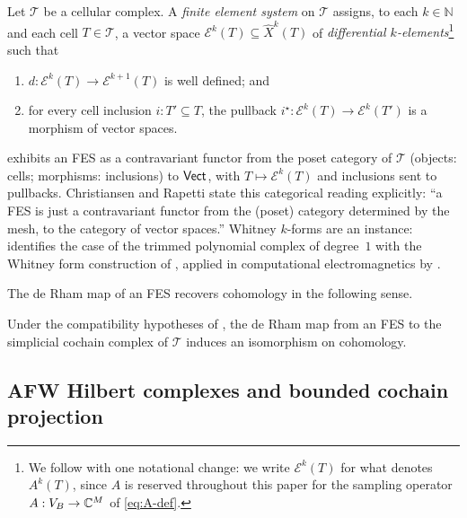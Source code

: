 \begin{definition}
\label{def:christiansen-fes}
Let $\mathcal{T}$ be a cellular complex. A \emph{finite element system}
on $\mathcal{T}$ assigns, to each $k \in \mathbb{N}$ and each cell
$T \in \mathcal{T}$, a vector space
$\mathcal{E}^k(T) \subseteq \widehat{X}^k(T)$
of \emph{differential $k$-elements}\footnote{We follow
\cite[\S 2, Def.~2]{Christiansen2010} with one notational change: we
write $\mathcal{E}^k(T)$ for what \cite{Christiansen2010} denotes
$A^k(T)$, since $A$ is reserved throughout this paper for the
sampling operator $A : V_B \to \mathbb{C}^M$ of \cref{eq:A-def}.}
such that
\begin{enumerate}
  \item $d : \mathcal{E}^k(T) \to \mathcal{E}^{k+1}(T)$ is well
        defined; and
  \item for every cell inclusion $i : T' \subseteq T$, the pullback
        $i^\star : \mathcal{E}^k(T) \to \mathcal{E}^k(T')$ is a
        morphism of vector spaces.
\end{enumerate}
\end{definition}

 exhibits an FES as a contravariant functor
from the poset category of $\mathcal{T}$ (objects: cells; morphisms:
inclusions) to $\mathsf{Vect}$, with $T \mapsto \mathcal{E}^k(T)$ and
inclusions sent to pullbacks. Christiansen and Rapetti
\cite{ChristiansenRapetti2025} state this categorical reading
explicitly: ``a FES is just a contravariant functor from the
(poset) category determined by the mesh, to the category of vector
spaces.'' Whitney $k$-forms are an instance:
\cite[Example~2.3]{Christiansen2010} identifies the case of the
trimmed polynomial complex of degree~$1$ with the Whitney form
construction of \cite{Whitney1957}, applied in computational
electromagnetics by \cite{Bossavit1988}.

The de Rham map of an FES recovers cohomology in the following sense.

\begin{proposition}\label{prop:fes-derham}
Under the compatibility hypotheses of
\cite[\S 2, Def.~3]{Christiansen2010}, the de Rham map from an FES to
the simplicial cochain complex of $\mathcal{T}$ induces an isomorphism
on cohomology.
\end{proposition}

\subsection{AFW Hilbert complexes and bounded cochain projection}\label{subsec:feec-afw}

